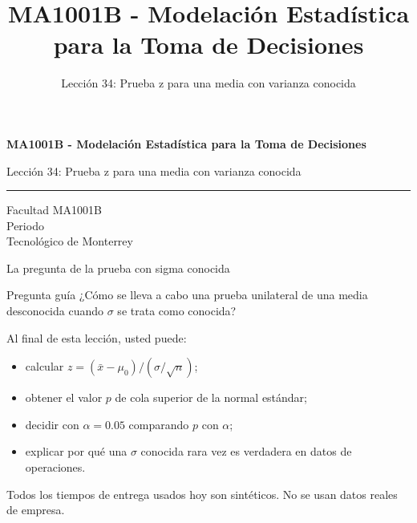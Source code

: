 \documentclass[aspectratio=169,10pt,spanish]{beamer}
\title{MA1001B - Modelación Estadística para la Toma de Decisiones}
\subtitle{Lección 34: Prueba z para una media con varianza conocida}
\author{}
\institute{Tecnol\'ogico de Monterrey}
\date{}
\begin{document}
\begin{frame}[plain]
  \vspace{1.2cm}
  {\Large\bfseries MA1001B - Modelación Estadística para la Toma de Decisiones\par}
  \vspace{0.7cm}
  {\large Lección 34: Prueba z para una media con varianza conocida\par}
  \vspace{0.7cm}
  {\color{TecRojo}\rule{\textwidth}{1.2pt}}
  \vspace{0.8cm}

  Facultad MA1001B\\[0.3cm]
  Periodo\\[0.3cm]
  Tecnol\'ogico de Monterrey
\end{frame}

\begin{frame}{La pregunta de la prueba con sigma conocida}
  \begin{alertblock}{Pregunta guía}
    ¿Cómo se lleva a cabo una prueba unilateral de una media desconocida
    cuando $\sigma$ se trata como conocida?
  \end{alertblock}

  \vspace{0.6em}
  Al final de esta lección, usted puede:
  \begin{itemize}
    \item calcular $z=(\bar{x}-\mu_{0})/(\sigma/\sqrt{n})$;
    \item obtener el valor $p$ de cola superior de la normal estándar;
    \item decidir con $\alpha=0.05$ comparando $p$ con $\alpha$;
    \item explicar por qué una $\sigma$ conocida rara vez es verdadera en
      datos de operaciones.
  \end{itemize}

  \vfill
  \scriptsize Todos los tiempos de entrega usados hoy son sintéticos. No se usan datos reales de empresa.
\end{frame}
\end{document}

